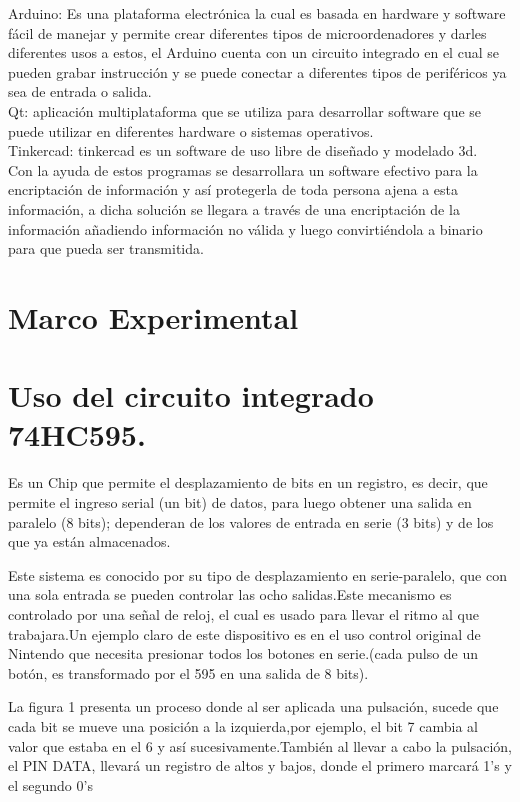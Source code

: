 \documentclass{article}
\begin{document}
Arduino: Es una plataforma electrónica la cual es basada en hardware y software fácil de manejar y permite crear diferentes tipos de microordenadores y darles diferentes usos a estos, el Arduino cuenta con un circuito integrado en el cual se pueden grabar instrucción y se puede conectar a diferentes tipos de periféricos ya sea de entrada o salida.\\

Qt: aplicación multiplataforma que se utiliza para desarrollar software que se puede utilizar en diferentes hardware o sistemas operativos.\\

Tinkercad: tinkercad es un software de uso libre de diseñado y modelado 3d.\\

Con la ayuda de estos programas se desarrollara un software efectivo para la encriptación de información y así protegerla de toda persona ajena a esta información, a dicha solución se llegara a través de una encriptación de la información añadiendo información no válida y luego convirtiéndola a binario para que pueda ser transmitida.

\newpage
\section{Marco Experimental}
\label{Marco Experimental}




\newpage
\section{Uso del circuito integrado 74HC595.}
\label{74HC595}


Es un Chip que permite el desplazamiento de bits en un registro, es decir, que permite el ingreso serial (un bit) de datos, para luego obtener una salida en paralelo (8 bits); dependeran de los valores de entrada en serie (3 bits) y de los que ya están almacenados.

Este sistema es conocido por su tipo de desplazamiento en serie-paralelo, que con una sola entrada se pueden controlar las ocho salidas.Este mecanismo es controlado por una señal de reloj, el cual es usado para llevar el ritmo al que trabajara.Un ejemplo claro de este dispositivo es en el uso control original de Nintendo que necesita presionar todos los botones en serie.(cada pulso de un botón, es transformado por el 595 en una salida de 8 bits).

La figura 1 presenta un proceso donde al ser aplicada una pulsación, sucede que cada bit se mueve una posición a la izquierda,por ejemplo, el bit 7 cambia al valor que estaba en el 6 y así sucesivamente.También al llevar a cabo la pulsación, el PIN DATA, llevará un registro de altos y bajos, donde el primero marcará 1’s y el segundo 0’s
\end{document}
